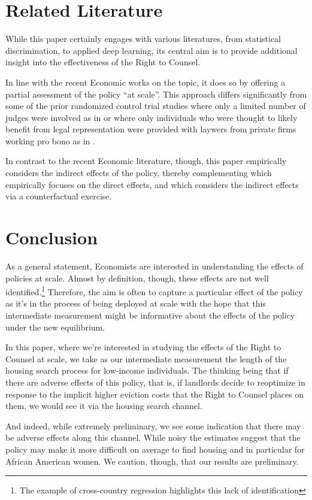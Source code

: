 \documentclass[a4paper,12pt]{article}
\begin{document}
\section{Related Literature}
 While this paper certainly engages with various literatures, from statistical discrimination, to applied deep learning, its central aim is to provide additional insight into the effectiveness of the Right to Counsel. \par 
 In line with the recent Economic works on the topic, it does so by offering a partial assessment of the policy ``at scale''. This approach differs significantly from some of the prior randomized control trial studies where only a limited number of judges were involved as in \cite{greiner2012limits} or where only individuals who were thought to likely benefit from legal representation were provided with laywers from private firms working pro bono as in \cite{seron2001impact}.   

In contrast to the recent Economic literature, though, this paper empirically considers the indirect effects of the policy, thereby complementing \cite{cassidy2022effects} which empirically focuses on the direct effects, and \cite{abramson2021welfare} which considers the indirect effects via a counterfactual exercise.
\section{Conclusion}
As a general statement, Economists are interested in understanding the effects of policies at scale. Almost by definition, though, these effects are not well identified.\footnote{The example of cross-country regression highlights this lack of identification} Therefore, the aim is often to capture a particular effect of the policy as it's in the process of being deployed at scale with the hope that this intermediate measurement might be informative about the effects of the policy under the new equilibrium.\par 
In this paper, where we're interested in studying the effects of the Right to Counsel at scale, we take as our intermediate measurement the length of the housing search process for low-income individuals. The thinking being that if there are adverse effects of this policy, that is, if landlords decide to reoptimize in response to the implicit higher eviction costs that the Right to Counsel places on them, we would see it via the housing search channel. \par 
And indeed, while extremely preliminary, we see some indication that there may be adverse effects along this channel. While noisy the estimates suggest that the policy may make it more difficult on average to find housing and in particular for African American women. We caution, though, that our results are preliminary. 
\end{document}

